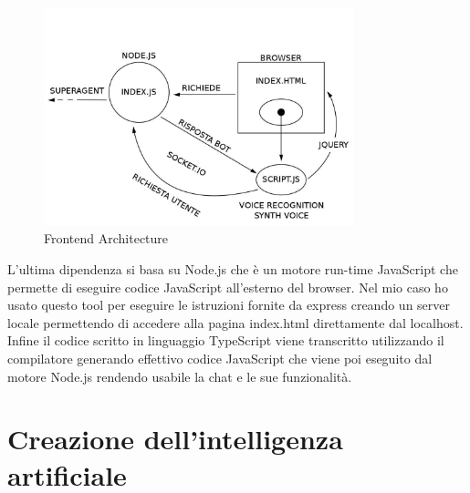 \begin{figure}[H]
 \centering
  \includegraphics[width=0.8\textwidth]{img/frontend.png}
 \caption{Frontend Architecture}
\end{figure}
L'ultima dipendenza si basa su Node.js che è un motore run-time JavaScript che permette di eseguire codice JavaScript all'esterno del browser. Nel mio caso ho usato questo tool per eseguire le istruzioni fornite da express creando un server locale permettendo di accedere alla pagina index.html direttamente dal localhost.
Infine il codice scritto in linguaggio TypeScript viene transcritto utilizzando il compilatore generando effettivo codice JavaScript che viene poi eseguito dal motore Node.js rendendo usabile la chat e le sue funzionalità.

\section{Creazione dell'intelligenza artificiale}

